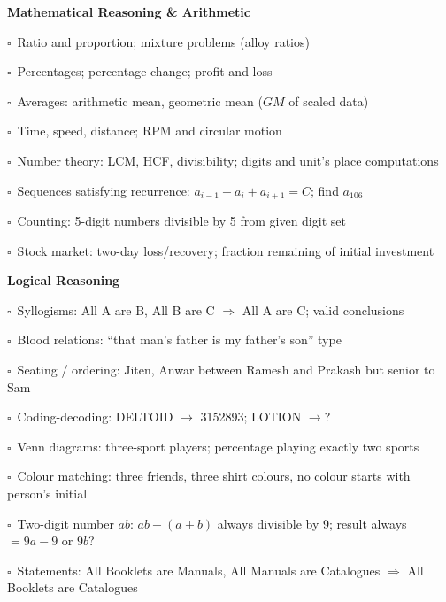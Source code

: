 \documentclass[11pt,a4paper]{article}
\newcommand{\chk}{\textcolor{rulegray}{$\square$}\ }
\begin{document}
\begin{subtopics}

  \item \textbf{Mathematical Reasoning \& Arithmetic}
  \begin{subtopics}
    \item \chk Ratio and proportion; mixture problems (alloy ratios)
    \item \chk Percentages; percentage change; profit and loss
    \item \chk Averages: arithmetic mean, geometric mean ($GM$ of scaled data)
    \item \chk Time, speed, distance; RPM and circular motion
    \item \chk Number theory: LCM, HCF, divisibility; digits and unit's place computations
    \item \chk Sequences satisfying recurrence: $a_{i-1}+a_i+a_{i+1}=C$; find $a_{106}$
    \item \chk Counting: 5-digit numbers divisible by 5 from given digit set
    \item \chk Stock market: two-day loss/recovery; fraction remaining of initial investment
  \end{subtopics}

  \item \textbf{Logical Reasoning}
  \begin{subtopics}
    \item \chk Syllogisms: All A are B, All B are C $\Rightarrow$ All A are C; valid conclusions
    \item \chk Blood relations: ``that man's father is my father's son'' type
    \item \chk Seating / ordering: Jiten, Anwar between Ramesh and Prakash but senior to Sam
    \item \chk Coding-decoding: DELTOID $\to$ 3152893; LOTION $\to$?
    \item \chk Venn diagrams: three-sport players; percentage playing exactly two sports
    \item \chk Colour matching: three friends, three shirt colours, no colour starts with person's initial
    \item \chk Two-digit number $ab$: $ab-(a+b)$ always divisible by 9; result always $= 9a-9$ or $9b$?
    \item \chk Statements: All Booklets are Manuals, All Manuals are Catalogues $\Rightarrow$ All Booklets are Catalogues
  \end{subtopics}


\end{subtopics}
\end{document}

